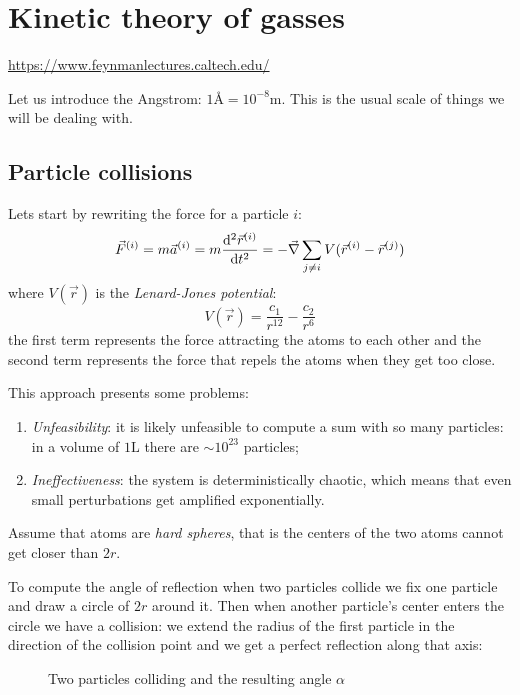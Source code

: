 \documentclass[12pt]{extarticle}
\begin{document}
\section{Kinetic theory of gasses}

\url{https://www.feynmanlectures.caltech.edu/}

Let us introduce the Angstrom: $1 \si{\angstrom} = 10^{-8} \si{\meter}$. This is the usual scale of things we will be dealing with.

\subsection{Particle collisions}

Lets start by rewriting the force for a particle $i$:
\begin{equation}
    \vec F^{(i)} = m \vec a^{(i)} = m \dv[2]{\vec r^{(i)}}{t} = - \vec \nabla \sum_{j \ne i} V(\vec r^{(i)} - \vec r^{(j)})
\end{equation}
where $V(\vec r)$ is the \emph{Lenard-Jones potential}:
\begin{equation}
    V(\vec r) = \frac{c_1}{r^{12}} - \frac{c_2}{r^6}
\end{equation}
the first term represents the force attracting the atoms to each other and the second term represents the force that repels the atoms when they get too close.

This approach presents some problems:
\begin{enumerate}
    \item \emph{Unfeasibility}: it is likely unfeasible to compute a sum with so many particles: in a volume of $1 \si{\liter}$ there are $\sim 10^{23}$ particles;
    \item \emph{Ineffectiveness}: the system is deterministically chaotic, which means that even small perturbations get amplified exponentially.
\end{enumerate}

Assume that atoms are \emph{hard spheres}, that is the centers of the two atoms cannot get closer than $2r$.

To compute the angle of reflection when two particles collide we fix one particle and draw a circle of $2r$ around it.
Then when another particle's center enters the circle we have a collision: we extend the radius of the first particle in the direction of the collision point and we get a perfect reflection along that axis:

\begin{figure}[H]
    \centering
    
    \caption{Two particles colliding and the resulting angle $\alpha$}
\end{figure}
\end{document}
